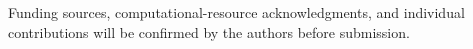 Funding sources, computational-resource acknowledgments, and individual contributions will be confirmed by the authors before submission.
